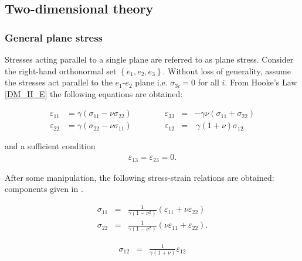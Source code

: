 	\subsection{Two-dimensional theory}
		\subsubsection*{General plane stress}
			Stresses acting parallel to a single plane are referred to as plane stress. 
			Consider the right-hand orthonormal set $\left\{e_1, e_2, e_3\right\}$. Without
			loss of generality, assume the stresses act parallel to the $e_1$-$e_2$ plane
			i.e. $\sigma_{3i} = 0$ for all $i$. From Hooke's Law \eqref{DM_H_E} the
			following equations are obtained: \label{sym:e_i}

			\begin{equation}
				\begin{aligned}
					\varepsilon_{11} & =  \gamma  ( \sigma_{11} - \nu \sigma_{22}) \qquad \qquad \varepsilon_{33} & = & - \gamma \nu (\sigma_{11} + \sigma_{22})          \\
					\varepsilon_{22} & =   \gamma (\sigma_{22} - \nu\sigma_{11}) \qquad \qquad \varepsilon_{12}   & = & \  \gamma (1+\nu) \sigma_{12} \label{strain_comp}
				\end{aligned}
			\end{equation}

			and a sufficient condition
			\begin{eqnarray}
				\varepsilon_{13} =  \varepsilon_{23} = 0.
			\end{eqnarray}

			After some manipulation, the following stress-strain relations are obtained:
			components given in \cite{Fung65}.

			\begin{minipage}{.5\linewidth}
				\begin{eqnarray*}
					\sigma_{11} & = & \frac{1}{\gamma(1-\nu^2)} ( \varepsilon_{11} + \nu\varepsilon_{22})\\
					\sigma_{22} & = & \frac{1}{\gamma(1-\nu^2)} (\nu \varepsilon_{11} + \varepsilon_{22}).
				\end{eqnarray*}
			\end{minipage}%
			\begin{minipage}{.5\linewidth}
				\begin{eqnarray}
					\sigma_{12} & = & \frac{1}{\gamma(1+\nu)} \varepsilon_{12} \label{stress_comp}
				\end{eqnarray}
			\end{minipage}

